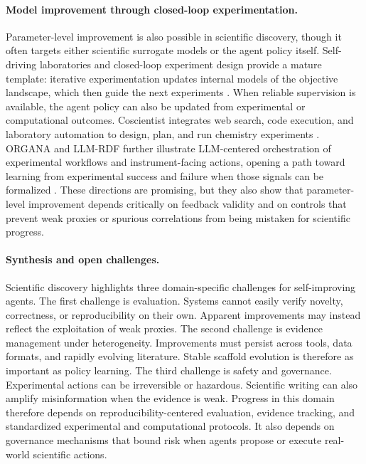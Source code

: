 \paragraph{Model improvement through closed-loop experimentation.}
Parameter-level improvement is also possible in scientific discovery, though it often targets either scientific surrogate models or the agent policy itself. Self-driving laboratories and closed-loop experiment design provide a mature template: iterative experimentation updates internal models of the objective landscape, which then guide the next experiments \citep{tobias2025autonomous}. When reliable supervision is available, the agent policy can also be updated from experimental or computational outcomes. Coscientist integrates web search, code execution, and laboratory automation to design, plan, and run chemistry experiments \citep{boiko2023autonomous}. ORGANA and LLM-RDF further illustrate LLM-centered orchestration of experimental workflows and instrument-facing actions, opening a path toward learning from experimental success and failure when those signals can be formalized \citep{darvish2025organa, ruan2024automatic}. These directions are promising, but they also show that parameter-level improvement depends critically on feedback validity and on controls that prevent weak proxies or spurious correlations from being mistaken for scientific progress.

\paragraph{Synthesis and open challenges.}
Scientific discovery highlights three domain-specific challenges for self-improving agents. The first challenge is evaluation. Systems cannot easily verify novelty, correctness, or reproducibility on their own. Apparent improvements may instead reflect the exploitation of weak proxies. The second challenge is evidence management under heterogeneity. Improvements must persist across tools, data formats, and rapidly evolving literature. Stable scaffold evolution is therefore as important as policy learning. The third challenge is safety and governance. Experimental actions can be irreversible or hazardous. Scientific writing can also amplify misinformation when the evidence is weak. Progress in this domain therefore depends on reproducibility-centered evaluation, evidence tracking, and standardized experimental and computational protocols. It also depends on governance mechanisms that bound risk when agents propose or execute real-world scientific actions.



